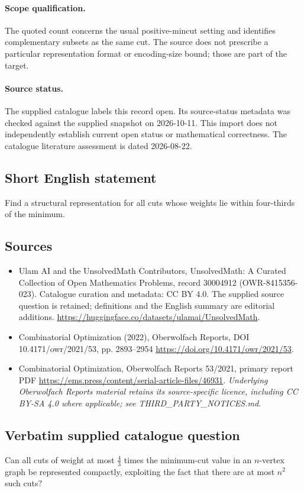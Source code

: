 \documentclass[11pt]{article}
\begin{document}
\paragraph{Scope qualification.}
The quoted count concerns the usual positive-mincut setting and identifies complementary subsets as the same cut. The source does not prescribe a particular representation format or encoding-size bound; those are part of the target.
\paragraph{Source status.}
The supplied catalogue labels this record open. Its source-status metadata was checked against the supplied snapshot on 2026-10-11. This import does not independently establish current open status or mathematical correctness. The catalogue literature assessment is dated 2026-08-22.
\subsection{Short English statement}
Find a structural representation for all cuts whose weights lie within four-thirds of the minimum.
\subsection{Sources}
\begin{itemize}
\item[S1] Ulam AI and the UnsolvedMath Contributors, UnsolvedMath: A Curated Collection of Open Mathematics Problems, record 30004912 (OWR-8415356-023). Catalogue curation and metadata: CC BY 4.0. The supplied source question is retained; definitions and the English summary are editorial additions.
\url{https://huggingface.co/datasets/ulamai/UnsolvedMath}.
\item[S2] Combinatorial Optimization (2022), Oberwolfach Reports, DOI 10.4171/owr/2021/53, pp. 2893--2954
\url{https://doi.org/10.4171/owr/2021/53}.
\item[S3] Combinatorial Optimization, Oberwolfach Reports 53/2021, primary report PDF
\url{https://ems.press/content/serial-article-files/46931}.
\textit{Underlying Oberwolfach Reports material retains its source-specific licence, including CC BY-SA 4.0 where applicable; see THIRD\_PARTY\_NOTICES.md.}
\end{itemize}
\subsection{Verbatim supplied catalogue question}
Can all cuts of weight at most $\tfrac43$ times the minimum-cut value in an $n$-vertex graph be represented compactly, exploiting the fact that there are at most $n^2$ such cuts?
\end{document}
